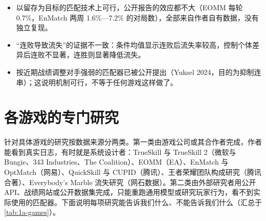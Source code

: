 \begin{keybox}
\begin{itemize}
  \item 以留存为目标的匹配技术上可行，公开报告的效应都不大（EOMM 每轮 0.7\%，EnMatch 两周 1.6\%—7.2\% 的对局数），全部来自作者自有数据，没有独立复现。
  \item “连败导致流失”的证据不一致：条件均值显示连败后流失率较高，控制个体差异后连败不显著，连胜则显著降低流失。
  \item 按近期战绩调整对手强弱的匹配器已被公开提出（Yuksel 2024，目的为抑制连串）；这说明机制可行，不等于任何游戏这样做了。
\end{itemize}
\end{keybox}

\section{各游戏的专门研究}\label{sec:1a-games}

针对具体游戏的研究按数据来源分两类。第一类由游戏公司或其合作者完成，作者能看到真实日志，有时就是系统设计者：TrueSkill 与 TrueSkill 2（微软与 Bungie、343 Industries、The Coalition）、EOMM（EA）、EnMatch 与 OptMatch（网易）、QuickSkill 与 CUPID（腾讯）、王者荣耀团队构成研究（腾讯合著）、Everybody's Marble 流失研究（网石数据）。第二类由外部研究者用公开 API、战绩网站或公开数据集完成，只能重跑通用模型或研究玩家行为，看不到实际使用的匹配器。下面说明每项研究能告诉我们什么、不能告诉我们什么（汇总于\cref{tab:1a-games}）。

